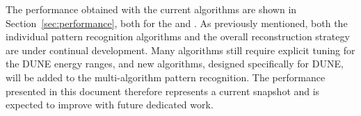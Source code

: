 
The performance obtained with the current algorithms are shown in Section~\ref{sec:performance}, both for the  and .  As previously mentioned, both the individual pattern recognition algorithms and the overall reconstruction strategy are under continual development. Many algorithms %
still require explicit tuning for the DUNE energy ranges, and new algorithms, designed specifically for DUNE, will be added to the multi-algorithm pattern recognition. The performance presented in this document therefore represents a current snapshot and is expected to improve with future dedicated work. 


